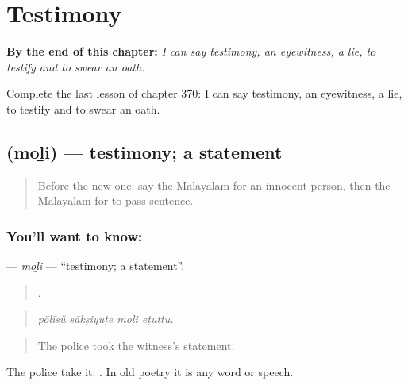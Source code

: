 
\chapter{Testimony}
\label{ch:ml-testimony}

\begin{chapteropening}
\textbf{By the end of this chapter:} \emph{I can say testimony, an eyewitness, a lie, to testify and to swear an oath.}

Complete the last lesson of chapter 370: I can say testimony, an eyewitness, a lie, to testify and to swear an oath.
\end{chapteropening}

\section[\texorpdfstring{\ml{മൊഴി} (moḻi)}{മൊഴി (moḻi)}]{ (moḻi) — testimony; a statement}

\label{lesson:ML-C370-moli}



\begin{quote}
Before the new one: say the Malayalam for an innocent person, then the Malayalam for to pass sentence.
\end{quote}

\subsection*{You'll want to know: }
\textbf{} — \emph{moḻi} — \textquotedblleft{}testimony; a statement\textquotedblright{}.

\begin{quote}
   .
\end{quote}

\begin{quote}
\emph{pōlīsŭ sākṣiyuṭe moḻi eṭuttu.}
\end{quote}

\begin{quote}
The police took the witness's statement.
\end{quote}

The police take it:  . In old poetry it is any word or speech.

